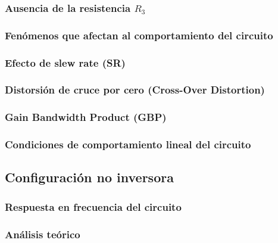 \subsubsection{Ausencia de la resistencia $R_3$}

\subsubsection{Fen\'omenos que afectan al comportamiento del circuito} %
	\subsubsection*{Efecto de slew rate (SR)}
	\subsubsection*{Distorsi\'on de cruce por cero (Cross-Over Distortion)}
	\subsubsection*{Gain Bandwidth Product (GBP)}

\subsubsection{Condiciones de comportamiento lineal del circuito}


\subsection{Configuraci\'on no inversora}

\subsubsection{Respuesta en frecuencia del circuito} %
\subsubsection*{An\'alisis te\'orico} %

